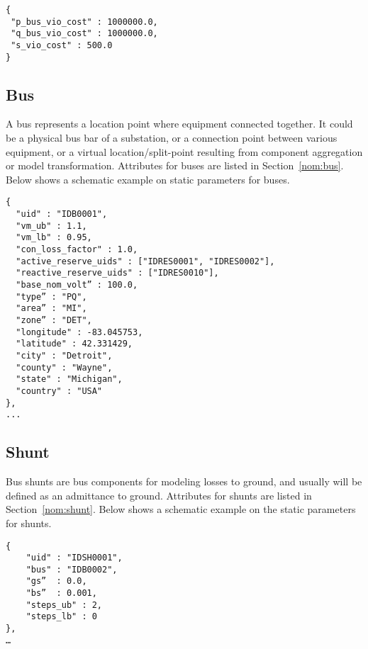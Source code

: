 \begin{verbatim}
{
 "p_bus_vio_cost" : 1000000.0,
 "q_bus_vio_cost" : 1000000.0,
 "s_vio_cost" : 500.0
}
\end{verbatim}


\subsection{Bus}
\label{sec:bus}
A bus represents a location point where equipment connected together.
It could be a physical bus bar of a substation, or 
a connection point between various equipment, 
or a virtual location/split-point resulting from
component aggregation or model transformation.
Attributes for buses are listed in Section~\ref{nom:bus}.
Below shows a schematic example on static parameters for buses.
\begin{verbatim}
{
  "uid" : "IDB0001",
  "vm_ub" : 1.1,
  "vm_lb" : 0.95,
  "con_loss_factor" : 1.0,
  "active_reserve_uids" : ["IDRES0001", "IDRES0002"],
  "reactive_reserve_uids" : ["IDRES0010"],
  "base_nom_volt” : 100.0,
  "type” : "PQ",
  "area” : "MI",
  "zone” : "DET",
  "longitude" : -83.045753,
  "latitude" : 42.331429,
  "city" : "Detroit",
  "county" : "Wayne",
  "state" : "Michigan",
  "country" : "USA"
},
...
\end{verbatim}


\subsection{Shunt}
\label{sec:shunt}
Bus shunts are bus components for modeling losses to ground, and 
usually will be defined as an admittance to ground.
Attributes for shunts are listed in Section~\ref{nom:shunt}.
Below shows a schematic example on the static parameters for shunts.
\begin{verbatim}
{
    "uid" : "IDSH0001",
    "bus" : "IDB0002",
    "gs”  : 0.0,
    "bs”  : 0.001,
    "steps_ub" : 2,
    "steps_lb" : 0
},
…    
\end{verbatim}


